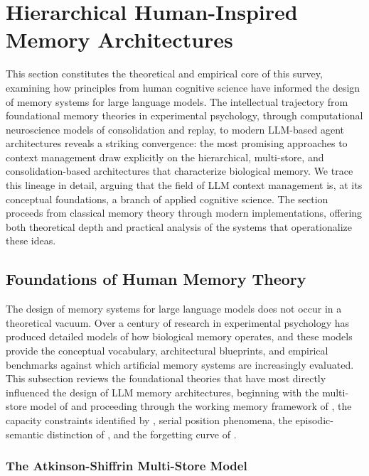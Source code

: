 \section{Hierarchical Human-Inspired Memory Architectures}
\label{sec:hierarchical}

This section constitutes the theoretical and empirical core of this survey, examining how principles from human cognitive science have informed the design of memory systems for large language models. The intellectual trajectory from foundational memory theories in experimental psychology, through computational neuroscience models of consolidation and replay, to modern LLM-based agent architectures reveals a striking convergence: the most promising approaches to context management draw explicitly on the hierarchical, multi-store, and consolidation-based architectures that characterize biological memory. We trace this lineage in detail, arguing that the field of LLM context management is, at its conceptual foundations, a branch of applied cognitive science. The section proceeds from classical memory theory through modern implementations, offering both theoretical depth and practical analysis of the systems that operationalize these ideas.

\subsection{Foundations of Human Memory Theory}

The design of memory systems for large language models does not occur in a theoretical vacuum. Over a century of research in experimental psychology has produced detailed models of how biological memory operates, and these models provide the conceptual vocabulary, architectural blueprints, and empirical benchmarks against which artificial memory systems are increasingly evaluated. This subsection reviews the foundational theories that have most directly influenced the design of LLM memory architectures, beginning with the multi-store model of \citet{atkinson1968human} and proceeding through the working memory framework of \citet{baddeley1974working}, the capacity constraints identified by \citet{miller1956magical}, serial position phenomena, the episodic-semantic distinction of \citet{tulving1972episodic}, and the forgetting curve of \citet{ebbinghaus1885memory}.

\subsubsection{The Atkinson-Shiffrin Multi-Store Model}

